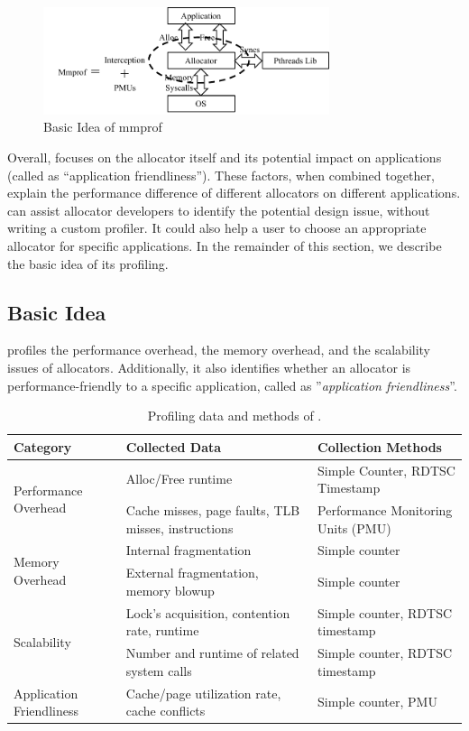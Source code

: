 \begin{figure}[!ht]
\centering
\includegraphics[width=3.3in]{figures/basicidea}
\caption{Basic Idea of mmprof\label{fig:basicidea}}
\end{figure}

Overall, \MP{} focuses on the allocator itself and its potential impact on applications (called as ``application friendliness''). These factors, when combined together, explain the performance difference of different allocators on different applications. \MP{} can assist allocator developers to identify the potential design issue, without writing a custom profiler. It could also help a user to choose an appropriate allocator for specific applications. In the remainder of this section, we describe the basic idea of its profiling. 

\subsection{Basic Idea}
\MP{} profiles the performance overhead, the memory overhead, and the scalability issues of allocators. Additionally, it also identifies whether an allocator is performance-friendly to a specific application, called as ''\textit{application friendliness}''.  


\begin{table}[h]
  \centering
  \footnotesize
\begin{tabular}{l | l | l}
\hline
Category & Collected Data & Collection Methods \\ \hline
\multirow{2}{*}{Performance Overhead} & {Alloc/Free runtime} & Simple Counter, RDTSC Timestamp\\ \cline{2-3}
& {Cache misses, page faults, TLB misses, instructions} & Performance Monitoring Units (PMU) \\ \hline
\multirow{2}{*}{Memory Overhead} & Internal fragmentation & Simple counter\\ \cline{2-3}
& {External fragmentation, memory blowup} & Simple counter \\ \hline
\multirow{2}{*}{Scalability} & Lock's acquisition, contention rate, runtime & Simple counter, RDTSC timestamp\\ \cline{2-3}
& {Number and runtime of related system calls} & Simple counter, RDTSC timestamp \\ \hline
{Application Friendliness} & Cache/page utilization rate, cache conflicts & Simple counter, PMU \\ \hline
  \end{tabular}
  \centering
  \caption{Profiling data and methods of \MP{}.\label{table:alldata}}
\end{table}


